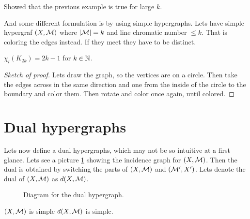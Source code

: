 \begin{thm}
	Showed that the previous example is true for large $k$.
\end{thm}

And some different formulation is by using simple hypergraphs. Lets have simple hypergraf $(X,\mathcal{M})$ where $|\mathcal{M}| = k$ and line chromatic number $\leq k$. That is coloring the edges instead. If they meet they have to be distinct.

\begin{prop}
	$\chi_l (K_{2k}) = 2k-1$ for $k \in \mathbb{N}$.
\end{prop}

\begin{proof}[Sketch of proof]
	Lets draw the graph, so the vertices are on a circle. Then take the edges across in the same direction and one from the inside of the circle to the boundary and color them. Then rotate and color once again, until colored.
\end{proof}

\section{Dual hypergraphs}

Lets now define a dual hypergraphs, which may not be so intuitive at a first glance. Lets see a picture \ref{dual-hg} showing the incidence graph for $(X,\mathcal{M})$. Then the dual is obtained by switching the parts of $(X, \mathcal{M})$ and $(\mathcal{M}',X')$. Lets denote the dual of $(X,\mathcal{M})$ as $d(X,\mathcal{M})$.

\begin{figure}[!ht]\centering
	\caption{Diagram for the dual hypergraph.}
	\label{dual-hg}
\end{figure}

\begin{lemma}
	$(X,\mathcal{M})$ is simple \ifft $d(X,\mathcal{M})$ is simple.
\end{lemma}

